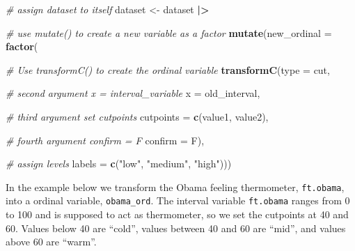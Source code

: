 \documentclass[
]{book}
\newenvironment{Shaded}{\begin{snugshade}}{\end{snugshade}}
\newcommand{\AttributeTok}[1]{\textcolor[rgb]{0.13,0.29,0.53}{#1}}
\newcommand{\CommentTok}[1]{\textcolor[rgb]{0.56,0.35,0.01}{\textit{#1}}}
\newcommand{\FunctionTok}[1]{\textcolor[rgb]{0.13,0.29,0.53}{\textbf{#1}}}
\newcommand{\NormalTok}[1]{#1}
\newcommand{\OtherTok}[1]{\textcolor[rgb]{0.56,0.35,0.01}{#1}}
\newcommand{\SpecialCharTok}[1]{\textcolor[rgb]{0.81,0.36,0.00}{\textbf{#1}}}
\newcommand{\StringTok}[1]{\textcolor[rgb]{0.31,0.60,0.02}{#1}}
\begin{document}
\begin{Shaded}
\begin{Highlighting}[]
\CommentTok{\# assign dataset to itself}
\NormalTok{dataset }\OtherTok{\textless{}{-}}\NormalTok{ dataset }\SpecialCharTok{|\textgreater{}}
  
  \CommentTok{\# use \textasciigrave{}mutate()\textasciigrave{} to create a new variable as a factor}
  \FunctionTok{mutate}\NormalTok{(}\AttributeTok{new\_ordinal =} \FunctionTok{factor}\NormalTok{(}
    
    \CommentTok{\# Use transformC() to create the ordinal variable}
    \FunctionTok{transformC}\NormalTok{(}\AttributeTok{type =} \StringTok{\textquotesingle{}cut\textquotesingle{}}\NormalTok{,}
               
               \CommentTok{\# second argument x = interval\_variable}
               \AttributeTok{x =}\NormalTok{ old\_interval,}
               
               \CommentTok{\# third argument set cutpoints}
               \AttributeTok{cutpoints =} \FunctionTok{c}\NormalTok{(value1, value2),}
               
               \CommentTok{\# fourth argument confirm = F}
               \AttributeTok{confirm =}\NormalTok{ F),}
    
    \CommentTok{\# assign levels}
    \AttributeTok{labels =} \FunctionTok{c}\NormalTok{(}\StringTok{"low"}\NormalTok{, }\StringTok{"medium"}\NormalTok{, }\StringTok{"high"}\NormalTok{)))}
\end{Highlighting}
\end{Shaded}

In the example below we transform the Obama feeling thermometer, \texttt{ft.obama}, into a ordinal variable, \texttt{obama\_ord}. The interval variable \texttt{ft.obama} ranges from 0 to 100 and is supposed to act as thermometer, so we set the cutpoints at 40 and 60. Values below 40 are ``cold'', values between 40 and 60 are ``mid'', and values above 60 are ``warm''.
\end{document}
